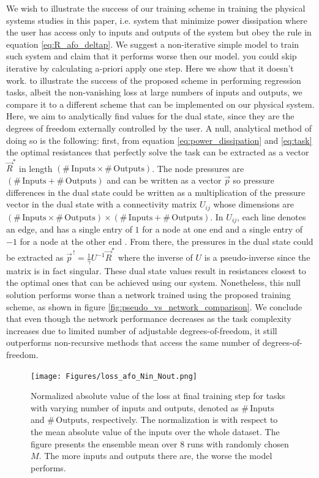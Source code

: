 \documentclass[%
 reprint,
 amsmath,amssymb,
 aps,
]{revtex4-2}
\begin{document}
    We wish to illustrate the success of our training scheme in training the physical systems studies in this paper, i.e. system that minimize power dissipation where the user has access only to inputs and outputs of the system but obey the rule in equation \ref{eq:R_afo_deltap}. We suggest a non-iterative simple model to train such system and claim that it performs worse then our model. you could skip iterative by calculating a-priori apply one step. Here we show that it doesn't work. to illustrate the success of the proposed scheme in performing regression tasks, albeit the non-vanishing loss at large numbers of inputs and outputs, we compare it to a different scheme that can be implemented on our physical system. Here, we aim to analytically find values for the dual state, since they are the degrees of freedom externally controlled by the user.  
    A null, analytical method of doing so is the following: first, from equation \ref{eq:power_dissipation} and \ref{eq:task} the optimal resistances that perfectly solve the task can be extracted as a vector $\vec{R}^*$ in length  $\left(\# \, \text{Inputs}\times \# \, \text{Outputs}\right)$.
    The node pressures are $\left(\# \, \text{Inputs} + \# \, \text{Outputs}\right)$ and can be written as a vector $\vec{p}$ so pressure differences in the dual state could be written as a multiplication of the pressure vector in the dual state with a connectivity matrix $U_{ij}$ whose dimensions are $\left(\# \, \text{Inputs}\times \# \, \text{Outputs}\right)\times\left(\# \, \text{Inputs} + \# \, \text{Outputs}\right)$. In $U_{ij}$, each line denotes an edge, and has a single entry of $1$ for a node at one end and a single entry of $-1$ for a node at the other end \cite{rocks2017designing, rocks2019limits}. 
    From there, the pressures in the dual state could be extracted as $\vec{p}^{\,!}=\frac{1}{\gamma}U^{-1}\vec{R}^*$ where the inverse of $U$ is a pseudo-inverse since the matrix is in fact singular. These dual state values result in resistances closest to the optimal ones that can be achieved using our system.
    Nonetheless, this null solution performs worse than a network trained using the proposed training scheme, as shown in figure \ref{fig:pseudo_vs_network_comparison}. 
    We conclude that even though the network performance decreases as the task complexity increases due to limited number of adjustable degrees-of-freedom, it still outperforms non-recursive methods that access the same number of degrees-of-freedom.

    \begin{figure}[ht]
    \centerline{
    \texttt{[image: Figures/loss\_afo\_Nin\_Nout.png]}
    }
    \caption{Normalized absolute value of the loss at final training step for tasks with varying number of inputs and outputs, denoted as $\# \, \text{Inputs}$ and $\# \, \text{Outputs}$, respectively. The normalization is with respect to the mean absolute value of the inputs over the whole dataset. The figure presents the ensemble mean over $8$ runs with randomly chosen $M$. The more inputs and outputs there are, the worse the model performs.}
    \label{fig:log_loss_afo_inputs_outputs}
    \end{figure}
\end{document}
